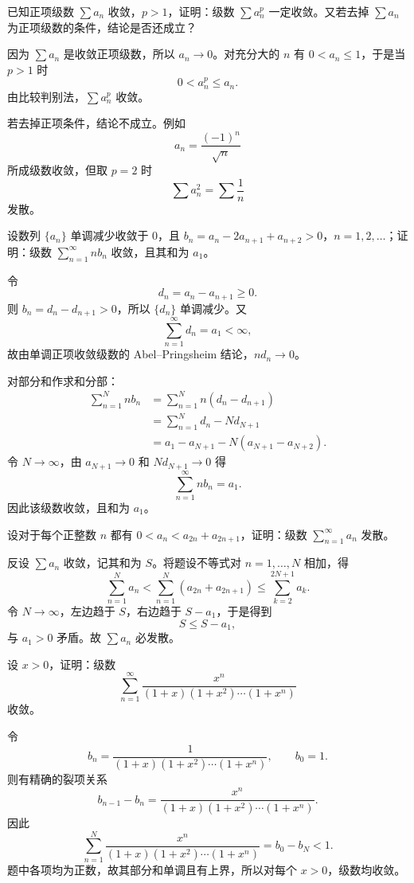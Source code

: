 \begin{xexercise}[7]
已知正项级数 $\sum a_n$ 收敛，$p>1$，证明：级数 $\sum a_n^p$ 一定收敛。又若去掉 $\sum a_n$ 为正项级数的条件，结论是否还成立？
\end{xexercise}
\begin{xsolution}
因为 $\sum a_n$ 是收敛正项级数，所以 $a_n\to0$。对充分大的 $n$ 有 $0<a_n\leq1$，于是当 $p>1$ 时
\[
 0<a_n^p\leq a_n.
\]
由比较判别法，$\sum a_n^p$ 收敛。

若去掉正项条件，结论不成立。例如
\[
 a_n=\frac{(-1)^n}{\sqrt n}
\]
所成级数收敛，但取 $p=2$ 时
\[
 \sum a_n^2=\sum\frac1n
\]
发散。
\end{xsolution}


\begin{xexercise}[8]
设数列 $\{a_n\}$ 单调减少收敛于 0，且 $b_n=a_n-2a_{n+1}+a_{n+2}>0$，$n=1,2,\ldots$；证明：级数 $\sum_{n=1}^{\infty}nb_n$ 收敛，且其和为 $a_1$。
\end{xexercise}
\begin{xsolution}
令
\[
 d_n=a_n-a_{n+1}\geq0.
\]
则 $b_n=d_n-d_{n+1}>0$，所以 $\{d_n\}$ 单调减少。又
\[
 \sum_{n=1}^{\infty}d_n=a_1<\infty,
\]
故由单调正项收敛级数的 Abel--Pringsheim 结论，$nd_n\to0$。

对部分和作求和分部：
\[
 \begin{aligned}
 \sum_{n=1}^{N}nb_n
 &=\sum_{n=1}^{N}n(d_n-d_{n+1})\\
 &=\sum_{n=1}^{N}d_n-Nd_{N+1}\\
 &=a_1-a_{N+1}-N(a_{N+1}-a_{N+2}).
 \end{aligned}
\]
令 $N\to\infty$，由 $a_{N+1}\to0$ 和 $Nd_{N+1}\to0$ 得
\[
 \sum_{n=1}^{\infty}nb_n=a_1.
\]
因此该级数收敛，且和为 $a_1$。
\end{xsolution}


\begin{xexercise}[9]
设对于每个正整数 $n$ 都有 $0<a_n<a_{2n}+a_{2n+1}$，证明：级数 $\sum_{n=1}^{\infty}a_n$ 发散。
\end{xexercise}
\begin{xsolution}
反设 $\sum a_n$ 收敛，记其和为 $S$。将题设不等式对 $n=1,\ldots,N$ 相加，得
\[
 \sum_{n=1}^{N}a_n
 <\sum_{n=1}^{N}(a_{2n}+a_{2n+1})
 \leq\sum_{k=2}^{2N+1}a_k.
\]
令 $N\to\infty$，左边趋于 $S$，右边趋于 $S-a_1$，于是得到
\[
 S\leq S-a_1,
\]
与 $a_1>0$ 矛盾。故 $\sum a_n$ 必发散。
\end{xsolution}


\begin{xexercise}[10]
设 $x>0$，证明：级数
\[
\sum_{n=1}^{\infty}\frac{x^n}{(1+x)(1+x^2)\cdots(1+x^n)}
\]
收敛。
\end{xexercise}
\begin{xsolution}
令
\[
 b_n=\frac1{(1+x)(1+x^2)\cdots(1+x^n)},
 \qquad b_0=1.
\]
则有精确的裂项关系
\[
 b_{n-1}-b_n
 =\frac{x^n}{(1+x)(1+x^2)\cdots(1+x^n)}.
\]
因此
\[
 \sum_{n=1}^{N}\frac{x^n}{(1+x)(1+x^2)\cdots(1+x^n)}
 =b_0-b_N<1.
\]
题中各项均为正数，故其部分和单调且有上界，所以对每个 $x>0$，级数均收敛。
\end{xsolution}


